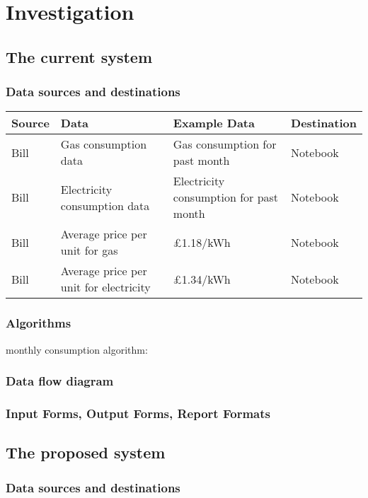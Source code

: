 \section{Investigation}

\subsection{The current system}

\subsubsection{Data sources and destinations}
\begin{center}
\begin{tabular}{|l|l|l|l|}
	\hline
	\textbf{Source} & \textbf{Data} & \textbf{Example Data} & \textbf{Destination} \\ \hline
	Bill & Gas consumption data & Gas consumption for past month & Notebook \\ \hline
	Bill & Electricity consumption data & Electricity consumption for past month & Notebook \\ \hline
	Bill & Average price per unit for gas & £1.18/kWh & Notebook \\ \hline
           Bill & Average price per unit for electricity & £1.34/kWh & Notebook \\ \hline
\end{tabular}
\label{tab:Data sources and destinations for current system}
\end{center}

\subsubsection{Algorithms}
monthly consumption algorithm:
\subsubsection{Data flow diagram}

\subsubsection{Input Forms, Output Forms, Report Formats}

\subsection{The proposed system}

\subsubsection{Data sources and destinations}

